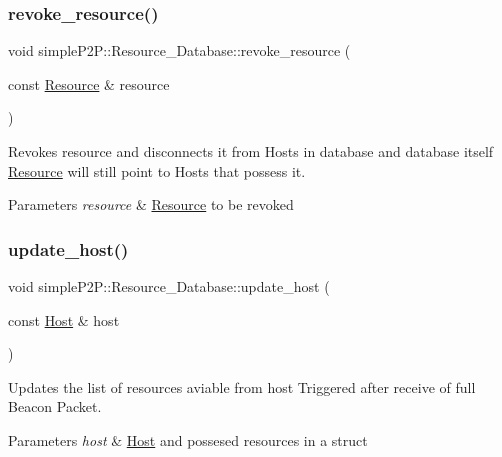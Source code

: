 \subsubsection{\texorpdfstring{revoke\+\_\+resource()}{revoke\_resource()}}
{\footnotesize\ttfamily void simple\+P2\+P\+::\+Resource\+\_\+\+Database\+::revoke\+\_\+resource (\begin{DoxyParamCaption}\item[{const \hyperlink{classsimpleP2P_1_1Resource}{Resource} \&}]{resource }\end{DoxyParamCaption})}



Revokes resource and disconnects it from Hosts in database and database itself \hyperlink{classsimpleP2P_1_1Resource}{Resource} will still point to Hosts that possess it. 


\begin{DoxyParams}{Parameters}
{\em resource} & \hyperlink{classsimpleP2P_1_1Resource}{Resource} to be revoked \\
\hline
\end{DoxyParams}
\mbox{\label{classsimpleP2P_1_1Resource__Database_a181e862da4be11acbdb7d5569ad6925a}} 
\subsubsection{\texorpdfstring{update\+\_\+host()}{update\_host()}}
{\footnotesize\ttfamily void simple\+P2\+P\+::\+Resource\+\_\+\+Database\+::update\+\_\+host (\begin{DoxyParamCaption}\item[{const \hyperlink{classsimpleP2P_1_1Host}{Host} \&}]{host }\end{DoxyParamCaption})}



Updates the list of resources aviable from host Triggered after receive of full Beacon Packet. 


\begin{DoxyParams}{Parameters}
{\em host} & \hyperlink{classsimpleP2P_1_1Host}{Host} and possesed resources in a struct \\
\hline
\end{DoxyParams}
\mbox{\label{classsimpleP2P_1_1Resource__Database_ac1914413c36b5b1cf343aac6e9ba7a6f}} 
